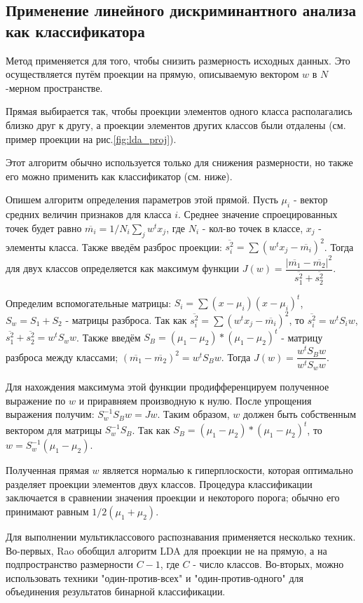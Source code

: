 
\subsection{Применение линейного дискриминантного анализа как классификатора}

Метод  применяется для того, чтобы снизить размерность исходных данных. Это осуществляется путём проекции на прямую, описываемую вектором $w$ в $N$-мерном пространстве.

Прямая выбирается так, чтобы проекции элементов одного класса располагались близко друг к другу, а проекции элементов других классов были отдалены (см. пример проекции на рис.\ref{fig:lda_proj}\cite{duda_lda}). 


Этот алгоритм обычно используется только для снижения размерности, но также его можно применить как классификатор (см. ниже).

Опишем алгоритм определения параметров этой прямой\cite{duda_lda}. Пусть $\mu_i$ - вектор средних величин признаков для класса $i$. Среднее значение спроецированных точек будет равно $\overline{m_i}=1/N_i\sum\limits_j w^tx_j$, где $N_i$ - кол-во точек в классе, $x_j$ - элементы класса. Также введём разброс проекции: $\overline{s_i^2}=\sum (w^tx_j-\overline{m_i})^2$. Тогда  для двух классов определяется как максимум функции $J(w)=\dfrac{|\overline{m_1}-\overline{m_2}|^2}{\overline{s_1^2}+\overline{s_2^2}}$.

Определим вспомогательные матрицы: $S_i=\sum(x-\mu_i)(x-\mu_i)^t$, $S_w=S_1+S_2$ - матрицы разброса. Так как $\overline{s_i^2}=\sum (w^tx_j-\overline{m_i})^2$, то $\overline{s_i^2}=w^tS_iw$, $\overline{s_1^2}+\overline{s_2^2}=w^tS_ww$. Также введём $S_B=(\mu_1-\mu_2)*(\mu_1-\mu_2)^t$ - матрицу разброса между классами; $(\overline{m_1}-\overline{m_2})^2=w^tS_Bw$. Тогда $J(w)=\dfrac{w^tS_Bw}{w^tS_ww}$. 

Для нахождения максимума этой функции продифференцируем полученное выражение по $w$ и приравняем производную к нулю. После упрощения выражения получим: $S_w^{-1}S_Bw=Jw$. Таким образом, $w$ должен быть собственным вектором для матрицы $S_w^{-1}S_B$. Так как $S_B=(\mu_1-\mu_2)*(\mu_1-\mu_2)^t$, то $w=S_w^{-1}(\mu_1-\mu_2)$. 

Полученная прямая $w$ является нормалью к гиперплоскости, которая оптимально разделяет проекции элементов двух классов. Процедура классификации заключается в сравнении значения проекции и некоторого порога; обычно его принимают равным $1/2(\mu_1+\mu_2)$.

Для выполнении мультиклассового распознавания применяется несколько техник. Во-первых, Rao\cite{lda_multiclass} обобщил алгоритм LDA для проекции не на прямую, а на подпространство размерности $C-1$, где $C$ - число классов. Во-вторых, можно использовать техники "один-против-всех" и "один-против-одного" для объединения результатов бинарной классификации.




